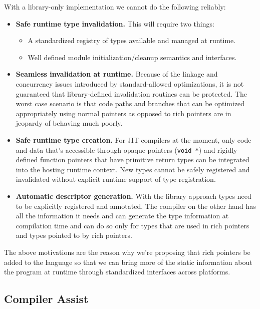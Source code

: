 With a library-only implementation we cannot do the following reliably:

\begin{itemize}

  \item \textbf{Safe runtime type invalidation.} This will require two things:

  \begin{itemize}

   \item A standardized registry of types available and managed at runtime.

   \item Well defined module initialization/cleanup semantics and interfaces.

  \end{itemize}

  \item \textbf{Seamless invalidation at runtime.} Because of the linkage and
  concurrency issues introduced by standard-allowed optimizations, it is not
  guaranteed that library-defined invalidation routines can be protected. The
  worst case scenario is that code paths and branches that can be optimized
  appropriately using normal pointers as opposed to rich pointers are in
  jeopardy of behaving much poorly.

  \item \textbf{Safe runtime type creation.} For JIT compilers at the moment,
  only code and data that’s accessible through opaque pointers (\verb+void *+)
  and rigidly-defined function pointers that have primitive return types can
  be integrated into the hosting runtime context. New types cannot be safely
  registered and invalidated without explicit runtime support of type
  registration.

  \item \textbf{Automatic descriptor generation.} With the library approach
  types need to be explicitly registered and annotated. The compiler on the
  other hand has all the information it needs and can generate the type
  information at compilation time and can do so only for types that are used
  in rich pointers and types pointed to by rich pointers.

\end{itemize}

The above motivations are the reason why we’re proposing that rich pointers be
added to the language so that we can bring more of the static information
about the program at runtime through standardized interfaces across platforms.

\subsection{Compiler Assist}